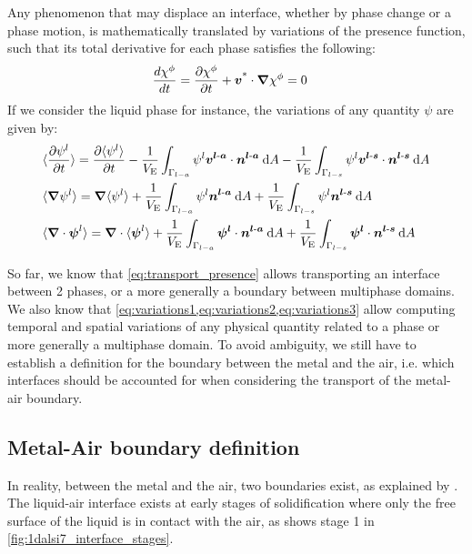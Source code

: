 Any phenomenon that may displace an interface, whether by phase change or a phase motion, is 
mathematically translated by variations of the presence function, such that its total derivative for each phase
satisfies the following:
%
\begin{align}
\label{eq:transport_presence}
& \frac{d \chi^\phi}{dt} = \frac{\partial \chi^\phi}{\partial t}  + \boldsymbol{v^\text{*}} \cdot \boldsymbol{\nabla} \chi^\phi = 0
\end{align}
%
If we consider the liquid phase for instance, the variations of any quantity $\psi$ are given by:
\begin{align}
\label{eq:variations1}
& \langle {\ensuremath{\frac{\partial \psi^l}{\partial t} }} \rangle = \frac{\partial \langle \psi^l \rangle}{\partial t} 
							- \frac{1}{V_\text{E}} \int_{\Gamma_{l-a}} \psi^l \boldsymbol{v^{l\text{-}a}} \cdot \boldsymbol{n^{l\text{-}a}}\: \mathrm{d}A
							- \frac{1}{V_\text{E}} \int_{\Gamma_{l-s}} \psi^l \boldsymbol{v^{l\text{-}s}} \cdot \boldsymbol{n^{l\text{-}s}}\: \mathrm{d}A \\
\label{eq:variations2}
& \langle \boldsymbol{\nabla} \psi^l \rangle =  \boldsymbol{\nabla}{\langle \psi^l \rangle} 
							+ \frac{1}{V_\text{E}} \int_{\Gamma_{l-a}} \psi^l \boldsymbol{n^{l\text{-}a}}\: \mathrm{d}A 
							+\frac{1}{V_\text{E}} \int_{\Gamma_{l-s}} \psi^l \boldsymbol{n^{l\text{-}s}} \: \mathrm{d}A \\
\label{eq:variations3}
& \langle \boldsymbol{\nabla} \cdot \boldsymbol{\psi}^l \rangle =  \boldsymbol{\nabla} \cdot {\ensuremath{\langle \boldsymbol{\psi}^l \rangle}} 
							+ \frac{1}{V_\text{E}} \int_{\Gamma_{l-a}} \boldsymbol{\psi^l} \cdot \boldsymbol{n^{l\text{-}a}} \: \mathrm{d}A 
							+\frac{1}{V_\text{E}} \int_{\Gamma_{l-s}} \boldsymbol{\psi^l} \cdot  \boldsymbol{n^{l\text{-}s}} \: \mathrm{d}A							
\end{align}

So far, we know that \cref{eq:transport_presence} allows transporting an interface between 2 phases, 
or a more generally a boundary between multiphase domains.
We also know that \cref{eq:variations1,eq:variations2,eq:variations3} allow computing temporal and spatial
variations of any physical quantity related to a phase or more generally a multiphase domain.
To avoid ambiguity, we still have to establish a definition for the boundary between the metal and the air, i.e. which 
interfaces should be accounted for when considering the transport of the metal-air boundary.



\subsection{Metal-Air boundary definition} \label{sec:M_A_definition}

In reality, between the metal and the air, two boundaries exist, as explained by \citet{niane_etude_2004}. 
The liquid-air interface exists at early stages of solidification where only the free surface of the liquid is in contact with the air, as shows stage 1 in  \cref{fig:1dalsi7_interface_stages}.

